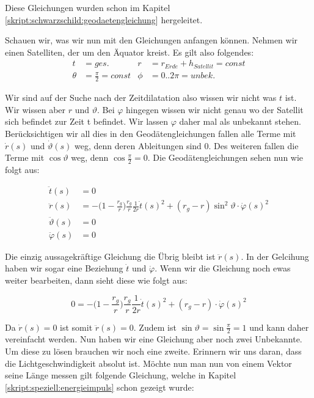 \begin{refsection}
\noindent{}Diese Gleichungen wurden schon im Kapitel \ref{skript:schwarzschild:geodaetengleichung} hergeleitet. 

Schauen wir, was wir nun mit den Gleichungen anfangen können. Nehmen wir einen Satelliten, der um den Äquator kreist. Es gilt also folgendes: \\

\begin{align*}
t &= ges. &
r &= r_{Erde} + h_{Satellit} = const \\
\theta &= \frac{\pi}{2} = const &
\phi &= 0..2\pi = unbek.
\end{align*}

\noindent{}Wir sind auf der Suche nach der Zeitdilatation also wissen wir nicht was \( t \) ist. Wir wissen aber \(  r \) und \( \vartheta \). Bei \( \varphi \) hingegen wissen wir nicht genau wo der Satellit sich befindet zur Zeit t befindet. Wir lassen \( \varphi \) daher mal als unbekannt stehen. Berücksichtigen wir all dies in den Geodätengleichungen fallen alle Terme mit \( \dot r(s) \) und \( \dot \vartheta (s) \) weg, denn deren Ableitungen sind 0. Des weiteren fallen die Terme mit \( \cos \vartheta \) weg, denn \( \cos \frac{\pi}{2} = 0 \). Die Geodätengleichungen sehen nun wie folgt aus:

\begin{align*}
\ddot t(s) &= 0 \\
\ddot r(s)
&=
-\biggl(1-\frac{r_g}{r}\biggr)\frac{r_g}{r}\frac1{2r}\dot t(s)^2
+ (r_g-r)\sin^2 \vartheta \cdot \dot \varphi(s)^2 \\
\ddot \vartheta(s) &= 0 \\
\ddot \varphi(s) &= 0
\end{align*}

\noindent{}Die einzig aussagekräftige Gleichung die Übrig bleibt ist \( \ddot r(s) \). In der Gelcihung haben wir sogar eine Beziehung \( \dot t \) und \( \dot \varphi \). Wenn wir die Gleichung noch ewas weiter bearbeiten, dann sieht diese wie folgt aus:

\begin{equation}
0 = -\biggl(1-\frac{r_g}{r}\biggr)\frac{r_g}{r}\frac1{2r}\dot t(s)^2 + (r_g-r)\cdot \dot \varphi(s)^2
\end{equation}

\noindent{}Da \( \dot r(s) = 0 \) ist somit \(  \ddot r(s) = 0 \). Zudem ist \( \sin \vartheta = \sin \frac{\pi}{2} = 1 \) und kann daher vereinfacht werden. Nun haben wir eine Gleichung aber noch zwei Unbekannte. Um diese zu lösen brauchen wir noch eine zweite. Erinnern wir uns daran, dass die Lichtgeschwindigkeit absolut ist. Möchte nun man nun von einem Vektor seine Länge messen gilt folgende Gleichung, welche in Kapitel \ref{skript:speziell:energieimpuls} schon gezeigt wurde:


\end{refsection}
